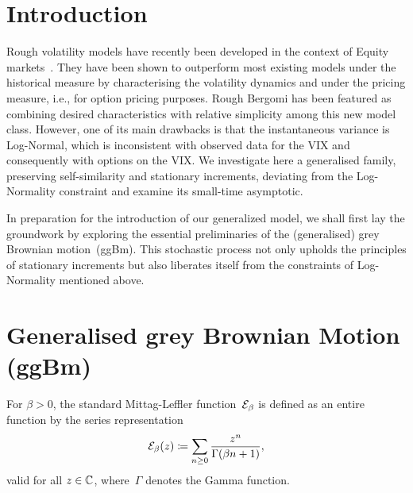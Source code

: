 \section{Introduction}

Rough volatility models have recently been developed in the context of Equity markets~\cite{Gatheral2018VolatilityRough}. They have been shown to outperform most existing models under the historical measure by characterising the volatility dynamics and under the pricing measure, i.e., for option pricing purposes. Rough Bergomi has been featured as combining desired characteristics with relative simplicity among this new model class. However, one of its main drawbacks is that the instantaneous variance is Log-Normal, which is inconsistent with observed data for the VIX and consequently with options on the VIX. We investigate here a generalised family, preserving self-similarity and stationary increments, deviating from the Log-Normality constraint and examine its small-time asymptotic.

In preparation for the introduction of our generalized model, we shall first lay the groundwork by exploring the essential preliminaries of the (generalised) grey Brownian motion~(ggBm). This stochastic process not only upholds the principles of stationary increments but also liberates itself from the constraints of Log-Normality mentioned above.

\section{Generalised grey Brownian Motion (ggBm)}\label{sec:ggBm_definitions}

For $\beta>0$, the standard Mittag-Leffler function~$\mathcal{E}_{\beta}$ is defined as an entire function by the series representation
\begin{equation}\label{def:MLf}
\mathcal{E}_{\beta}(z)\coloneqq\sum_{n\geq 0} \frac{z^n}{\Gamma(\beta n+1)},
\end{equation}
valid for all $z \in \mathbb{C}$, where~$\Gamma$ denotes the Gamma function. 

